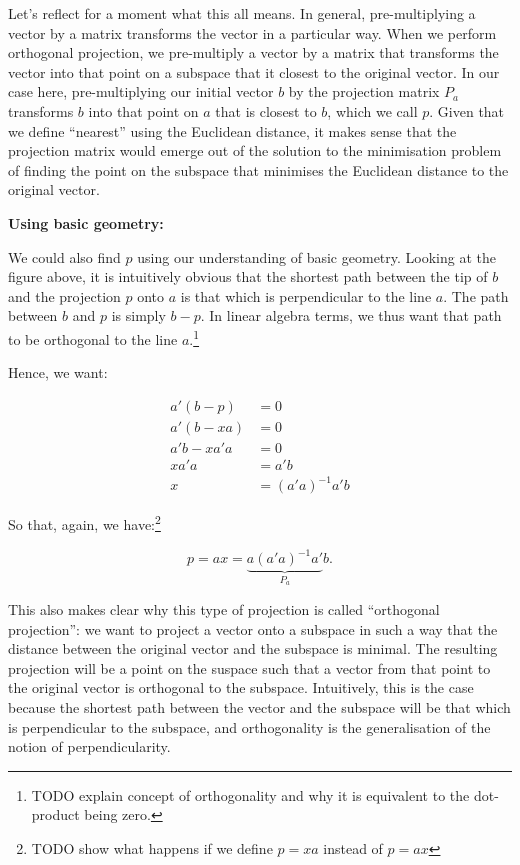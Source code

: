 \documentclass[
  letterpaper,
  DIV=11,
  numbers=noendperiod]{scrartcl}
\begin{document}
Let's reflect for a moment what this all means. In general,
pre-multiplying a vector by a matrix transforms the vector in a
particular way. When we perform orthogonal projection, we pre-multiply a
vector by a matrix that transforms the vector into that point on a
subspace that it closest to the original vector. In our case here,
pre-multiplying our initial vector \(b\) by the projection matrix
\(P_a\) transforms \(b\) into that point on \(a\) that is closest to
\(b\), which we call \(p\). Given that we define ``nearest'' using the
Euclidean distance, it makes sense that the projection matrix would
emerge out of the solution to the minimisation problem of finding the
point on the subspace that minimises the Euclidean distance to the
original vector.

\textbf{Using basic geometry:}

We could also find \(p\) using our understanding of basic geometry.
Looking at the figure above, it is intuitively obvious that the shortest
path between the tip of \(b\) and the projection \(p\) onto \(a\) is
that which is perpendicular to the line \(a\). The path between \(b\)
and \(p\) is simply \(b - p\). In linear algebra terms, we thus want
that path to be orthogonal to the line \(a\).\footnote{TODO explain
  concept of orthogonality and why it is equivalent to the dot-product
  being zero.}

Hence, we want:

\[
\begin{aligned}
a'(b - p) &= 0 \\
a'(b - xa) &= 0 \\
a'b - xa'a &= 0 \\
xa'a &= a'b \\
x &= (a'a)^{-1}a'b
\end{aligned}
\]

So that, again, we have:\footnote{TODO show what happens if we define
  \(p = xa\) instead of \(p = ax\)}

\[
p = ax = \underbrace{a(a'a)^{-1}a'}_\text{$P_a$}b.
\]

This also makes clear why this type of projection is called ``orthogonal
projection'': we want to project a vector onto a subspace in such a way
that the distance between the original vector and the subspace is
minimal. The resulting projection will be a point on the suspace such
that a vector from that point to the original vector is orthogonal to
the subspace. Intuitively, this is the case because the shortest path
between the vector and the subspace will be that which is perpendicular
to the subspace, and orthogonality is the generalisation of the notion
of perpendicularity.
\end{document}
